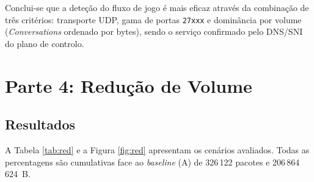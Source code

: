 \documentclass[11pt, a4paper]{article}
\begin{document}
Conclui-se que a deteção do fluxo de jogo é mais eficaz através da combinação de três critérios: transporte UDP, gama de portas \texttt{27xxx} e dominância por volume (\textit{Conversations} ordenado por bytes), sendo o serviço confirmado pelo DNS/SNI do plano de controlo.

\section{Parte 4: Redução de Volume}

\subsection{Resultados}
A Tabela \ref{tab:red} e a Figura \ref{fig:red} apresentam os cenários avaliados. Todas as percentagens são cumulativas face ao \textit{baseline} (A) de 326\,122 pacotes e 206\,864\,624~B.
\end{document}
